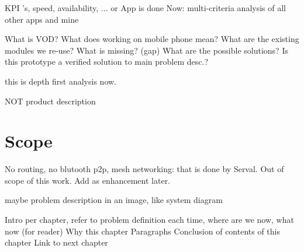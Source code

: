 KPI 's, speed, availability, ...
or
App is done
Now: multi-criteria analysis of all other apps and mine



What is VOD?
What does working on mobile phone mean?
What are the existing modules we re-use?
What is missing? (gap)
What are the possible solutions?
Is this prototype a verified solution to main problem desc.?


this is depth first analysis now.

NOT product description

\section{Scope}
No routing, no blutooth p2p, mesh networking: that is done by Serval. Out of scope of this work. Add as enhancement later.



maybe problem description in an image, like system diagram



Intro per chapter, refer to problem definition each time, where are we now, what now (for reader)
Why this chapter
Paragraphs
Conclusion of contents of this chapter
Link to next chapter


